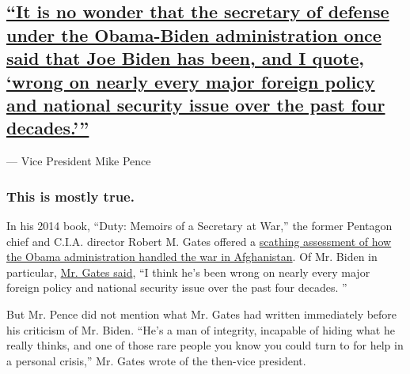 \hypertarget{it-is-no-wonder-that-the-secretary-of-defense-under-the-obama-biden-administration-once-said-that-joe-biden-has-been-and-i-quote-wrong-on-nearly-every-major-foreign-policy-and-national-security-issue-over-the-past-four-decades}{%
\subsection{\texorpdfstring{\protect\hyperlink{it-is-no-wonder-that-the-secretary-of-defense-under-the-obama-biden-administration-once-said-that-joe-biden-has-been-and-i-quote}{``It
is no wonder that the secretary of defense under the Obama-Biden
administration once said that Joe Biden has been, and I quote, `wrong on
nearly every major foreign policy and national security issue over the
past four
decades.'''}}{``It is no wonder that the secretary of defense under the Obama-Biden administration once said that Joe Biden has been, and I quote, `wrong on nearly every major foreign policy and national security issue over the past four decades.'''}}\label{it-is-no-wonder-that-the-secretary-of-defense-under-the-obama-biden-administration-once-said-that-joe-biden-has-been-and-i-quote-wrong-on-nearly-every-major-foreign-policy-and-national-security-issue-over-the-past-four-decades}}

--- Vice President Mike Pence

\hypertarget{this-is-mostly-true-1}{%
\subsubsection{This is mostly true.}\label{this-is-mostly-true-1}}

In his 2014 book, ``Duty: Memoirs of a Secretary at War,'' the former
Pentagon chief and C.I.A. director Robert M. Gates offered a
\href{https://slack-redir.net/link?url=https\%3A\%2F\%2Fwww.nytimes3xbfgragh.onion\%2F2014\%2F01\%2F08\%2Fworld\%2Fasia\%2Fobama-lost-faith-in-his-afghan-strategy-memoir-asserts.html}{scathing
assessment of how the Obama administration handled the war in
Afghanistan}. Of Mr. Biden in particular,
\href{https://slack-redir.net/link?url=https\%3A\%2F\%2Fwww.theatlantic.com\%2Fpolitics\%2Farchive\%2F2014\%2F01\%2Frobert-gates-thinks-joe-biden-hasnt-stopped-being-wrong-40-years\%2F356785\%2F}{Mr.
Gates said}, ``I think he's been wrong on nearly every major foreign
policy and national security issue over the past four decades. ''

But Mr. Pence did not mention what Mr. Gates had written immediately
before his criticism of Mr. Biden. ``He's a man of integrity, incapable
of hiding what he really thinks, and one of those rare people you know
you could turn to for help in a personal crisis,'' Mr. Gates wrote of
the then-vice president.

